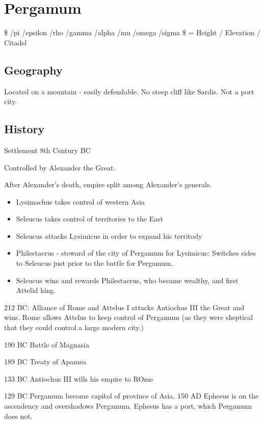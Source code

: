 \documentclass[
]{book}
\providecommand{\tightlist}{%
  \setlength{\itemsep}{0pt}\setlength{\parskip}{0pt}}
\begin{document}
\hypertarget{pergamum}{%
\chapter{Pergamum}\label{pergamum}}

\$ /pi /epsilon /rho /gamma /alpha /mu /omega /sigma \$ = Height / Elevation / Citadel

\hypertarget{geography-5}{%
\section{Geography}\label{geography-5}}

Located on a mountain - easily defendable. No steep cliff like Sardis. Not a port city.

\hypertarget{history-6}{%
\section{History}\label{history-6}}

Settlement 8th Century BC

Controlled by Alexander the Great.

After Alexander's death, empire split among Alexander's generals.

\begin{itemize}
\tightlist
\item
  Lysimachus takes control of western Asia
\item
  Seleucus takes control of territories to the East
\item
  Seleucus attacks Lysimicus in order to expand his territody
\item
  Philestaerus - steward of the city of Pergamum for Lysimicus: Switches sides to Seleucus just prior to the battle for Pergamum.
\item
  Seleucus wins and rewards Philestaerus, who became wealthy, and first Attelid king.
\end{itemize}

212 BC: Alliance of Rome and Attelus I attacks Antiochus III the Great and wins. Rome allows Attelus to keep control of Pergamum (as they were skeptical that they could control a large modern city.)

190 BC Battle of Magnasia

189 BC Treaty of Apamea

133 BC Antiochus III wills his empire to ROme

129 BC Pergamum become capitol of province of Asia. 150 AD Ephesus is on the ascendency and overshadows Pergamum. Ephesus has a port, which Pergamum does not.
\end{document}
